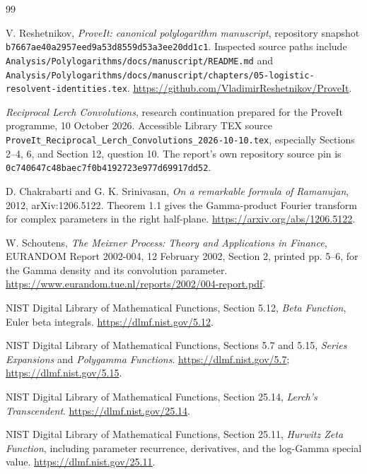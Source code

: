 \documentclass[11pt,letterpaper]{article}
\numberwithin{equation}{section}
\theoremstyle{definition}\newtheorem{definition}[theorem]{Definition}
\theoremstyle{remark}\newtheorem{remark}[theorem]{Remark}
\newcommand{\src}[1]{\nolinkurl{#1}}
\newcommand{\pin}{\src{b7667ae40a2957eed9a53d8559d53a3ee20dd1c1}}
\begin{document}
\begin{thebibliography}{99}
V. Reshetnikov, \emph{ProveIt: canonical polylogarithm manuscript},
repository snapshot \pin. Inspected source paths include
\src{Analysis/Polylogarithms/docs/manuscript/README.md} and
\src{Analysis/Polylogarithms/docs/manuscript/chapters/05-logistic-resolvent-identities.tex}.
\url{https://github.com/VladimirReshetnikov/ProveIt}.

\emph{Reciprocal Lerch Convolutions}, research continuation prepared for the
ProveIt programme, 10 October 2026. Accessible Library TEX source
\src{ProveIt_Reciprocal_Lerch_Convolutions_2026-10-10.tex}, especially
Sections 2--4, 6, and Section 12, question 10. The report's own repository
source pin is \src{0c740647c48baec7f0b4192723e977d69917dd52}.

D. Chakrabarti and G. K. Srinivasan, \emph{On a remarkable formula of
Ramanujan}, 2012, arXiv:1206.5122. Theorem 1.1 gives the Gamma-product
Fourier transform for complex parameters in the right half-plane.
\url{https://arxiv.org/abs/1206.5122}.

W. Schoutens, \emph{The Meixner Process: Theory and Applications in
Finance}, EURANDOM Report 2002-004, 12 February 2002, Section 2,
printed pp. 5--6, for the Gamma density and its convolution parameter.
\url{https://www.eurandom.tue.nl/reports/2002/004-report.pdf}.

NIST Digital Library of Mathematical Functions,
Section 5.12, \emph{Beta Function}, Euler beta integrals.
\url{https://dlmf.nist.gov/5.12}.

NIST Digital Library of Mathematical Functions,
Sections 5.7 and 5.15, \emph{Series Expansions} and
\emph{Polygamma Functions}.
\url{https://dlmf.nist.gov/5.7}; \url{https://dlmf.nist.gov/5.15}.

NIST Digital Library of Mathematical Functions,
Section 25.14, \emph{Lerch's Transcendent}.
\url{https://dlmf.nist.gov/25.14}.

NIST Digital Library of Mathematical Functions,
Section 25.11, \emph{Hurwitz Zeta Function}, including parameter
recurrence, derivatives, and the log-Gamma special value.
\url{https://dlmf.nist.gov/25.11}.
\end{thebibliography}
\end{document}
